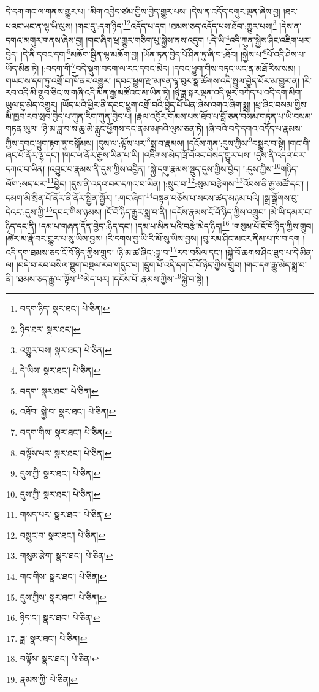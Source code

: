 དེ་དག་གང་ལ་གནས་གྱུར་པ། །མིག་འབྱེད་ཙམ་གྱིས་བྱེད་གྱུར་པས། །དེས་ན་འདོད་དགུར་ལྡན་ཞེས་བྱ། །ཐར་པའང་ཡང་ན་ལྷ་ཡི་ལུས། །གང་དུ་:དག་ཉིད་\footnote{བདག་ཉིད་  སྣར་ཐང་།  པེ་ཅིན། }\footnote{ཉིད་ཐར་  སྣར་ཐང་། }འདོད་པ་དག །ཐམས་ཅད་འདོད་པས་ཐོབ་:གྱུར་པས།\footnote{འགྱུར་བས།  སྣར་ཐང་།  པེ་ཅིན། } །དེས་ན་དགའ་མགུར་གནས་ཞེས་བྱ། །གང་ཞིག་ཕྲ་གྱུར་གཅིག་པུ་སྐྱེས་ནས་འདུག །:དེ་ཡི་\footnote{དེ་ཡིས་  སྣར་ཐང་།  པེ་ཅིན། }འདི་ཀུན་སྐྱེས་ཤིང་འཇིག་པར་བྱེད། །དེ་ནི་དབང་དག་\footnote{བདག་  སྣར་ཐང་།  པེ་ཅིན། }མཆོག་སྦྱིན་ལྷ་མཆོག་བྱ། །ཡོན་ཏན་བྱེད་པོ་ཤིན་ཏུ་ཞི་བ་:ཐོབ། །སྐྱེས་པ་\footnote{འཐོབ། སྐྱེ་བ་  སྣར་ཐང་།  པེ་ཅིན། }པོ་འདི་ཤེས་པ་ཡོད་མིན་ཏེ། །:བདག་གི་\footnote{བདག་གིས་  སྣར་ཐང་།  པེ་ཅིན། }བདེ་སྡུག་བདག་ལ་རང་དབང་མེད། །དབང་ཕྱུག་གིས་བཏང་ཡང་ན་མཐོ་རིས་སམ། །གཡང་ས་དག་ཏུ་འགྲོ་བ་ཁོ་ནར་འགྱུར། །དབང་ཕྱུག་རྫ་མཁན་ལྟ་བུར་སྣ་ཚོགས་འདི་སྤྲུལ་བྱེད་པོར་མ་གྱུར་ན། །རི་རབ་འདི་མི་གྲུབ་ཅིང་ས་གཞི་འདི་མིན་རྒྱ་མཚོའང་མ་ཡིན་ཏེ། །ཉི་ཟླ་སྐར་ལྡན་འདི་ལྟར་བཀོད་པ་འདི་དག་མིག་ཡུལ་དུ་མེད་འགྱུར། །ཡོད་པའི་ཕྱིར་ནི་དབང་ཕྱུག་འགྲོ་བའི་བྱེད་པོ་ཡིན་ཞེས་འགའ་ཞིག་སྨྲ། །ཕྲ་ཞིང་བསམ་གྱིས་མི་ཁྱབ་རབ་སྲབ་བྱེད་པ་ཀུན་རིག་ཀུན་བྱེད་པ། །རྣལ་འབྱོར་གོམས་པས་ཐོབ་པ་བློ་ཅན་བསམ་གཏན་པ་ཡི་བསམ་གཏན་ཡུལ། །ཉི་མ་ཟླ་བ་ས་ཆུ་མེ་རླུང་ཕྱོགས་དང་ནམ་མཁའི་ལུས་ཅན་ཏེ། །ཞི་བའི་བདེ་དགའ་འདོད་པ་རྣམས་ཀྱིས་དབང་ཕྱུག་རྟག་ཏུ་བསྒོམས། །དུས་ལ་:ལྟོས་པར་\footnote{བལྟོས་པར་  སྣར་ཐང་།  པེ་ཅིན། }སྨྲ་བ་རྣམས། །དངོས་ཀུན་:དུས་ཀྱིས་\footnote{དུས་ཀྱི་  སྣར་ཐང་།  པེ་ཅིན། }བསྒྱུར་བ་སྟེ། །གང་གི་ཞང་པོ་ནོར་ལྷ་དང་། །གང་ཕ་ནོར་རྒྱས་ཡིན་པ་ཡི། །འཇིགས་མེད་ཁྲོ་བོའང་བསད་གྱུར་པས། །དུས་ནི་འདའ་བར་དཀའ་བ་ཡིན། །འབྱུང་བ་རྣམས་ནི་དུས་ཀྱིས་འབྱིན། །སྐྱེ་དགུ་རྣམས་སྡུད་དུས་ཀྱིས་བྱེད། །:དུས་ཀྱིས་\footnote{དུས་ཀྱི་  སྣར་ཐང་།  པེ་ཅིན། }གཉིད་ལོག་:སད་པར་\footnote{གསད་པར་  སྣར་ཐང་།  པེ་ཅིན། }བྱེད། །དུས་ནི་འདའ་བར་དཀའ་བ་ཡིན། །:སྲུང་བ་\footnote{བསྲུང་བ་  སྣར་ཐང་།  པེ་ཅིན། }:སུམ་བརྩེགས་\footnote{གསུམ་རྩེག་  སྣར་ཐང་།  པེ་ཅིན། }འོབས་ནི་རྒྱ་མཚོ་དང་། །དམག་མི་སྲིན་པོ་ནོར་ནི་ནོར་སྦྱིན་སྦྱོར། །:གང་ཞིག་\footnote{གང་གིས་  སྣར་ཐང་།  པེ་ཅིན། }བསྟན་བཅོས་པ་སངས་ཚད་མཉམ་པའི། །སྒྲ་སྒྲོགས་བུ་དེའང་:དུས་ཀྱི་\footnote{དུས་ཀྱིས་  སྣར་ཐང་།  པེ་ཅིན། }དབང་གིས་ཉམས། །ངོ་བོ་ཉིད་རྒྱུར་སྨྲ་བ་ནི། །དངོས་རྣམས་ངོ་བོ་ཉིད་ཀྱིས་འགྲུབ། །མེ་ཡི་དམར་བ་ཉིད་དང་ནི། །དམ་པ་གཞན་དོན་བྱེད་:ཉིད་དང་། །དམ་པ་མིན་པའི་བརྩེ་མེད་ཉིད།\footnote{ཉིད་ང་།  སྣར་ཐང་།  པེ་ཅིན། } །གསུམ་པོ་ངོ་བོ་ཉིད་ཀྱིས་གྲུབ། །ཚེར་མ་རྣོ་བར་གྱུར་པ་སུ་ཡིས་བྱས། །རི་དགས་བྱ་ཡི་རི་མོ་སུ་ཡིས་བྱས། །བུ་རམ་ཤིང་མངར་ནིམ་པ་ཁ་བ་དག །འདི་དག་ཐམས་ཅད་ངོ་བོ་ཉིད་ཀྱིས་གྲུབ། །ཉི་མ་ཚ་ཞིང་:ཟླ་བ་\footnote{ཟླ་  སྣར་ཐང་།  པེ་ཅིན། }རབ་བསིལ་དང་། །སྐྱེ་བོ་ཆགས་ཤིང་ཐུབ་པ་དེ་མིན་ལ། །བདེ་བ་རབ་བསིལ་སྡུག་བསྔལ་རབ་གདུང་བ། །དྲུག་པོ་འདི་དག་ངོ་བོ་ཉིད་ཀྱིས་གྲུབ། །གང་དག་རྒྱུ་མེད་སྨྲ་བ་ནི། །ཐམས་ཅད་རྒྱུ་ལ་ལྟོས་\footnote{བལྟོས་  སྣར་ཐང་།  པེ་ཅིན། }མེད་པར། །དངོས་པོ་:རྣམས་ཀྱིས་\footnote{རྣམས་ཀྱི་  པེ་ཅིན། }སྐྱེ་བ་སྟེ། །
